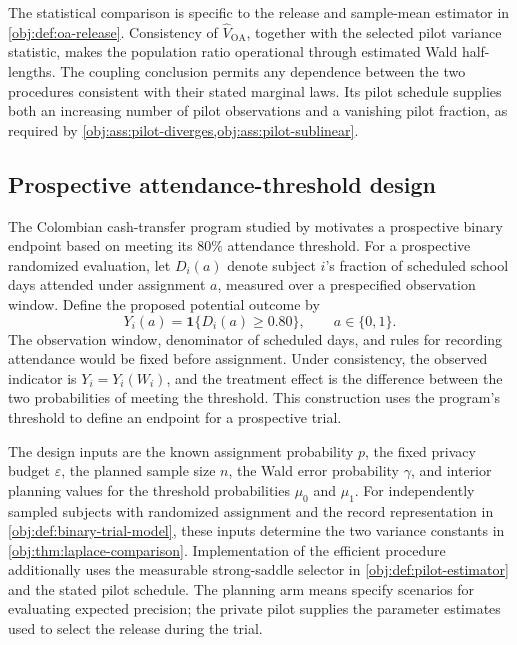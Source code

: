 \documentclass[11pt]{article}
\begin{document}
The statistical comparison is specific to the release and sample-mean estimator in \cref{obj:def:oa-release}. Consistency of \(\widehat V_{\mathrm{OA}}\), together with the selected pilot variance statistic, makes the population ratio operational through estimated Wald half-lengths. The coupling conclusion permits any dependence between the two procedures consistent with their stated marginal laws. Its pilot schedule supplies both an increasing number of pilot observations and a vanishing pilot fraction, as required by \cref{obj:ass:pilot-diverges,obj:ass:pilot-sublinear}.

\subsection{Prospective attendance-threshold design}

The Colombian cash-transfer program studied by \citet{BarreraOsorioEtAl2011} motivates a prospective binary endpoint based on meeting its \(80\%\) attendance threshold. For a prospective randomized evaluation, let \(D_i(a)\) denote subject \(i\)'s fraction of scheduled school days attended under assignment \(a\), measured over a prespecified observation window. Define the proposed potential outcome by
\[
Y_i(a)=\mathbf 1\{D_i(a)\ge 0.80\},
\qquad a\in\{0,1\}.
\]
The observation window, denominator of scheduled days, and rules for recording attendance would be fixed before assignment. Under consistency, the observed indicator is \(Y_i=Y_i(W_i)\), and the treatment effect is the difference between the two probabilities of meeting the threshold. This construction uses the program's threshold to define an endpoint for a prospective trial.

The design inputs are the known assignment probability \(p\), the fixed privacy budget \(\varepsilon\), the planned sample size \(n\), the Wald error probability \(\gamma\), and interior planning values for the threshold probabilities \(\mu_0\) and \(\mu_1\). For independently sampled subjects with randomized assignment and the record representation in \cref{obj:def:binary-trial-model}, these inputs determine the two variance constants in \cref{obj:thm:laplace-comparison}. Implementation of the efficient procedure additionally uses the measurable strong-saddle selector in \cref{obj:def:pilot-estimator} and the stated pilot schedule. The planning arm means specify scenarios for evaluating expected precision; the private pilot supplies the parameter estimates used to select the release during the trial.
\end{document}
